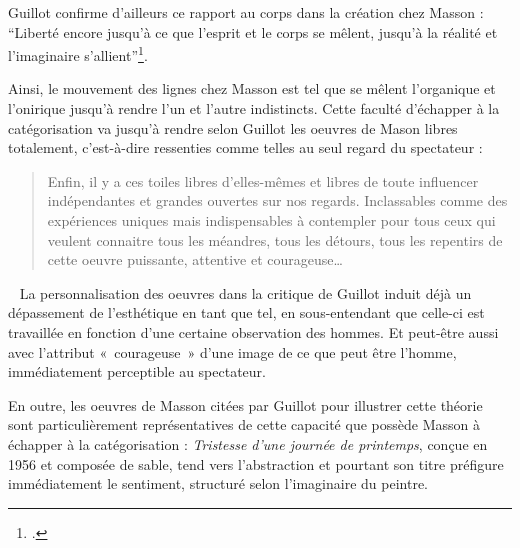 	
	 Guillot confirme d’ailleurs ce rapport au corps dans la création chez Masson : \enquote{Liberté encore jusqu’à ce que l’esprit et le corps se mêlent, jusqu’à la réalité et l’imaginaire s’allient}\footcite{massonlyon}. 

	Ainsi, le mouvement des lignes chez Masson est tel que se mêlent l’organique et l’onirique jusqu’à rendre l’un et l’autre indistincts. Cette faculté d’échapper à la catégorisation va jusqu’à rendre selon Guillot les oeuvres de Mason libres totalement, c’est-à-dire ressenties comme telles au seul regard du spectateur : 

	\begin{quote}
	Enfin, il y a ces toiles libres d’elles-mêmes et libres de toute influencer indépendantes et grandes ouvertes sur nos regards. Inclassables comme des expériences  uniques mais indispensables à contempler pour tous ceux qui veulent connaitre tous les méandres, tous les détours, tous les repentirs de cette oeuvre puissante, attentive et courageuse… 	
	\end{quote}
 
	 La personnalisation des oeuvres dans la critique de Guillot induit déjà un dépassement de l’esthétique en tant que tel, en sous-entendant que celle-ci est travaillée en fonction d’une certaine observation des hommes. Et peut-être aussi avec l’attribut « courageuse » d’une image de ce que peut être l’homme, immédiatement perceptible au spectateur.  

En outre, les oeuvres de Masson citées par Guillot pour illustrer cette théorie sont particulièrement représentatives de cette capacité que possède Masson à échapper à la catégorisation : \emph{Tristesse d’une journée de printemps}, conçue en 1956 et composée de sable, tend vers l’abstraction et pourtant son titre préfigure immédiatement le sentiment, structuré selon l’imaginaire du peintre. 


